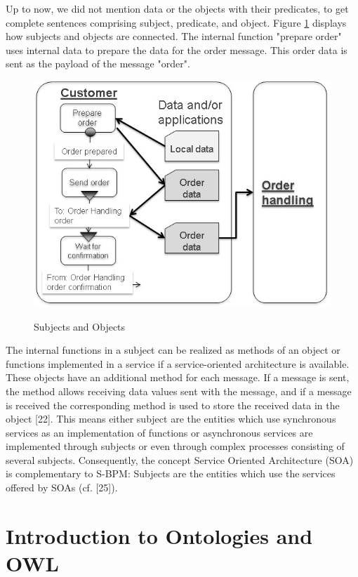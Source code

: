 Up to now, we did not mention data or the objects with their predicates, to get complete sentences comprising subject, predicate, and object. Figure \ref{fig:subjectobject} displays how subjects and objects are connected. The internal function "prepare order" uses internal data to prepare the data for the order message. This order data is sent as the payload of the message "order".

\begin{figure}[htbp]
	\centering
	\includegraphics[width=0.9\linewidth]{Figures/Ontology/SubjectExecution/SUbjectObject}
	\label{fig:subjectobject}
	\caption[Subjects and Objects]{Subjects and Objects}
\end{figure}

The internal functions in a subject can be realized as methods of an object or functions implemented in a service if a service-oriented architecture is available. These objects have an additional method for each message. If a message is sent, the method allows receiving data values sent with the message, and if a message is received the corresponding method is used to store the received data in the object [22]. This means either subject are the entities which use synchronous services as an implementation of functions or asynchronous services are implemented through subjects or even through complex processes consisting of several subjects. Consequently, the concept Service Oriented Architecture (SOA) is complementary to S-BPM: Subjects are the entities which use the services offered by SOAs (cf. [25]).

\section{Introduction to Ontologies and OWL }
\label{IntroOntology}

